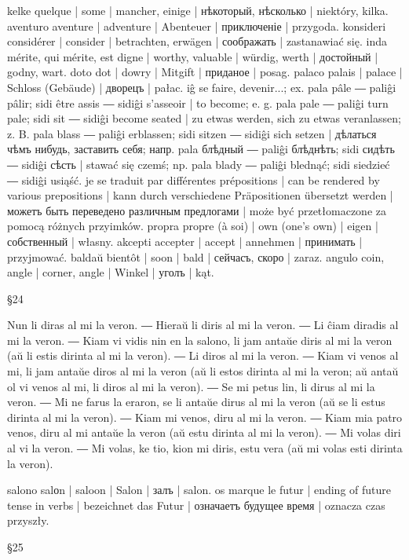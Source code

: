 kelke quelque | some | mancher, einige | нѣкоторый, нѣсколько | niektóry, kilka.
aventuro aventure | adventure | Abenteuer | приключеніе | przygoda.
konsideri considérer | consider | betrachten, erwägen | соображать | zastanawiać się.
inda mérite, qui mérite, est digne | worthy, valuable | würdig, werth | достойный | godny, wart.
doto dot | dowry | Mitgift | приданое | posag.
palaco palais | palace | Schloss (Gebäude) | дворецъ | pałac.
iĝ se faire, devenir...; ex. pala pâle ― paliĝi pâlir; sidi être assis ― sidiĝi s’asseoir | to become; e. g. pala pale ― paliĝi turn pale; sidi sit ― sidiĝi become seated | zu etwas werden, sich zu etwas veranlassen; z. B. pala blass ― paliĝi erblassen; sidi sitzen ― sidiĝi sich setzen | дѣлаться чѣмъ нибудь, заставить себя; напр. pala блѣдный ― paliĝi блѣднѣть; sidi сидѣть ― sidiĝi сѣсть | stawać się czemś; np. pala blady ― paliĝi blednąć; sidi siedzieć ― sidiĝi usiąść.
je se traduit par différentes prépositions | can be rendered by various prepositions | kann durch verschiedene Präpositionen übersetzt werden | можетъ быть переведено различным предлогами | może być przetłomaczone za pomocą różnych przyimków.
propra propre (à soi) | own (one’s own) | eigen | собственный | własny.
akcepti accepter | accept | annehmen | принимать | przyjmować.
baldaŭ bientôt | soon | bald | сейчасъ, скоро | zaraz.
angulo coin, angle | corner, angle | Winkel | уголъ | kąt.

§24

Nun li diras al mi la veron. ― Hieraŭ li diris al mi la veron. ― Li ĉiam diradis al mi la veron. ― Kiam vi vidis nin en la salono, li jam antaŭe diris al mi la veron (aŭ li estis dirinta al mi la veron). ― Li diros al mi la veron. ― Kiam vi venos al mi, li jam antaŭe diros al mi la veron (aŭ li estos dirinta al mi la veron; aŭ antaŭ ol vi venos al mi, li diros al mi la veron). ― Se mi petus lin, li dirus al mi la veron. ― Mi ne farus la eraron, se li antaŭe dirus al mi la veron (aŭ se li estus dirinta al mi la veron). ― Kiam mi venos, diru al mi la veron. ― Kiam mia patro venos, diru al mi antaŭe la veron (aŭ estu dirinta al mi la veron). ― Mi volas diri al vi la veron. ― Mi volas, ke tio, kion mi diris, estu vera (aŭ mi volas esti dirinta la veron).

salono salоn | saloon | Salon | залъ | salon.
os marque le futur | ending of future tense in verbs | bezeichnet das Futur | означаетъ будущее время | oznacza czas przyszły.

§25

